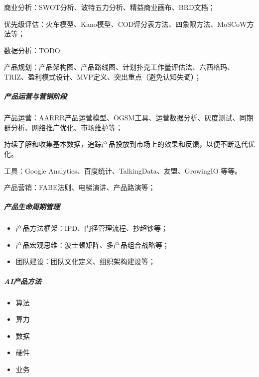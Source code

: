 \documentclass[letterpaper,11pt,english]{sphinxmanual}
\begin{document}
商业分析：SWOT分析、波特五力分析、精益商业画布、BRD文档；

优先级评估：火车模型、Kano模型、COD评分表方法、四象限方法、MoSCoW方法等；

数据分析：TODO:

产品规划：产品架构图、产品路线图、计划扑克工作量评估法、六西格玛、TRIZ、盈利模式设计、MVP定义、突出重点（避免认知失调）；


\subparagraph{产品运营与营销阶段}
\label{\detokenize{chapter_introduction/ability:id9}}
产品运营：AARRR产品运营模型、OGSM工具、运营数据分析、灰度测试、同期群分析、网络推广优化、市场维护等；

持续了解和收集基本数据，追踪产品投放到市场上的效果和反馈，以便不断迭代优化。%
\begin{footnote}[106]\sphinxAtStartFootnote
{}
%
\end{footnote}
工具：Google Analytics、百度统计、TalkingData、友盟、GrowingIO 等等。

产品营销：FABE法则、电梯演讲、产品路演等；


\subparagraph{产品生命周期管理}
\label{\detokenize{chapter_introduction/ability:id10}}\begin{itemize}
\item {} 
产品方法框架：IPD、门径管理流程、抄超钞等；

\item {} 
产品宏观思维：波士顿矩阵、多产品组合战略等；

\item {} 
团队建设：团队文化定义、组织架构建设等；

\end{itemize}


\subparagraph{AI产品方法}
\label{\detokenize{chapter_introduction/ability:ai}}\begin{itemize}
\item {} 
算法

\item {} 
算力

\item {} 
数据

\item {} 
硬件

\item {} 
业务

\end{itemize}
\end{document}
